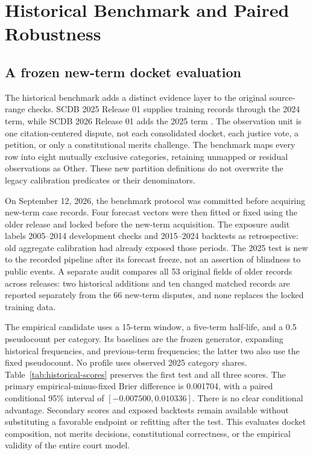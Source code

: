 \documentclass[
  journal=small,
  manuscript=research-article,
  year=2026
]{cup-journal}
\begin{document}
\section{Historical Benchmark and Paired Robustness}
\label{sec:historical}

\subsection{A frozen new-term docket evaluation}

The historical benchmark adds a distinct evidence layer to the original source-range checks. SCDB 2025 Release 01 supplies training records through the 2024 term, while SCDB 2026 Release 01 adds the 2025 term \citep{scdb2025,scdb2026}. The observation unit is one citation-centered dispute, not each consolidated docket, each justice vote, a petition, or only a constitutional merits challenge. The benchmark maps every row into eight mutually exclusive categories, retaining unmapped or residual observations as Other. These new partition definitions do not overwrite the legacy calibration predicates or their denominators.

On September 12, 2026, the benchmark protocol was committed before acquiring new-term case records. Four forecast vectors were then fitted or fixed using the older release and locked before the new-term acquisition. The exposure audit labels 2005--2014 development checks and 2015--2024 backtests as retrospective: old aggregate calibration had already exposed those periods. The 2025 test is new to the recorded pipeline after its forecast freeze, not an assertion of blindness to public events. A separate audit compares all 53 original fields of older records across releases: two historical additions and ten changed matched records are reported separately from the 66 new-term disputes, and none replaces the locked training data.

The empirical candidate uses a 15-term window, a five-term half-life, and a 0.5 pseudocount per category. Its baselines are the frozen generator, expanding historical frequencies, and previous-term frequencies; the latter two also use the fixed pseudocount. No profile uses observed 2025 category shares. Table~\ref{tab:historical-scores} preserves the first test and all three scores. The primary empirical-minus-fixed Brier difference is 0.001704, with a paired conditional 95\% interval of $[-0.007500,0.010336]$. There is no clear conditional advantage. Secondary scores and exposed backtests remain available without substituting a favorable endpoint or refitting after the test. This evaluates docket composition, not merits decisions, constitutional correctness, or the empirical validity of the entire court model.
\end{document}
